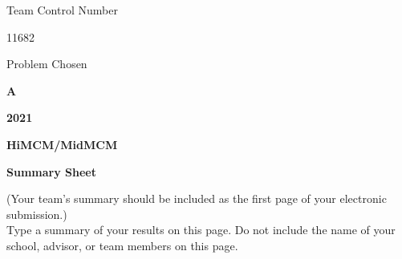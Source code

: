 \documentclass{article}
\begin{document}
\begin{centering}
    Team Control Number

    {\Huge 11682}

    Problem Chosen

    {\Huge \textbf{A}}

    {\Large \textbf{2021}}
    
    {\textbf{HiMCM/MidMCM}}

    {\textbf{Summary Sheet}}

\end{centering}
\makebox[\textwidth]{\rule{\textwidth}{0.6pt}}
\begin{centering}
    (Your team's summary should be included as the first page of your electronic submission.)\\
    Type a summary of your results on this page. Do not include the name of your school, advisor, or team members on this page.

\end{centering}
\end{document}
